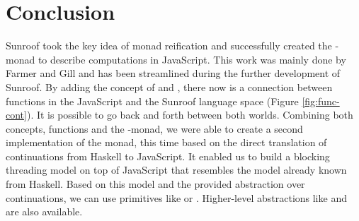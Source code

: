  
\section{Conclusion}

Sunroof took the key idea of monad reification and
successfully created the \JS-monad to describe computations
in JavaScript. This work was mainly done by Farmer and
Gill \cite{Farmer:12:WebDSLs} and has been streamlined during the 
further development of Sunroof. By adding the concept 
of  and , there now is a connection between
functions in the JavaScript and the Sunroof language space 
(Figure \ref{fig:func-cont}). It is possible to go back and forth between 
both worlds. Combining both concepts, functions and the \JS-monad,
we were able to create a second implementation of the monad, this
time based on the direct translation of continuations from Haskell
to JavaScript. It enabled us to build a blocking threading model
on top of JavaScript that resembles the model already known from Haskell.
Based on this model and the provided abstraction over continuations,
we can use primitives like  or .
Higher-level abstractions like  and  are also
available. 
